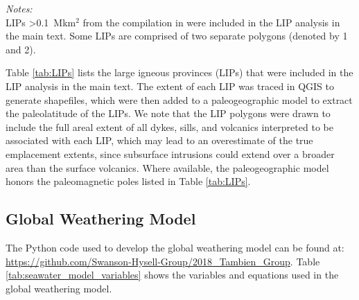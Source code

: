 \documentclass[11pt,letterpaper]{article}
\begin{document}
\begin{table}
	\flushleft \emph{Notes:} \\
    LIPs \textgreater0.1~Mkm$^{2}$ from the compilation in \citep{Ernst2008a} were included in the LIP analysis in the main text. Some LIPs are comprised of two separate polygons (denoted by 1 and 2).
	\label{tab:LIPs}
\end{table}

Table \ref{tab:LIPs} lists the large igneous provinces (LIPs) that were included in the LIP analysis in the main text. The extent of each LIP was traced in QGIS to generate shapefiles, which were then added to a paleogeographic model \citep{Swanson-Hysell2018a} to extract the paleolatitude of the LIPs. We note that the LIP polygons were drawn to include the full areal extent of all dykes, sills, and volcanics interpreted to be associated with each LIP, which may lead to an overestimate of the true emplacement extents, since subsurface intrusions could extend over a broader area than the surface volcanics. Where available, the paleogeographic model honors the paleomagnetic poles listed in Table \ref{tab:LIPs}.

\subsection*{Global Weathering Model}

The Python code used to develop the global weathering model can be found at: \url{https://github.com/Swanson-Hysell-Group/2018_Tambien_Group}. Table \ref{tab:seawater_model_variables} shows the variables and equations used in the global weathering model.
\end{document}
